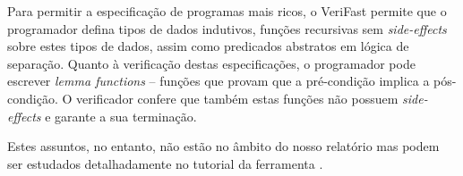 Para permitir a especificação de programas mais ricos, o VeriFast permite que o programador defina tipos de dados indutivos, funções recursivas sem \textit{side-effects} sobre estes tipos de dados, assim como predicados abstratos em lógica de separação. Quanto à verificação destas especificações, o programador pode escrever \emph{lemma functions} -- funções que provam que a pré-condição implica a pós-condição. O verificador confere que também estas funções não possuem \textit{side-effects} e garante a sua terminação.

Estes assuntos, no entanto, não estão no âmbito do nosso relatório mas podem ser estudados detalhadamente no tutorial da ferramenta \cite{tutorial}.
